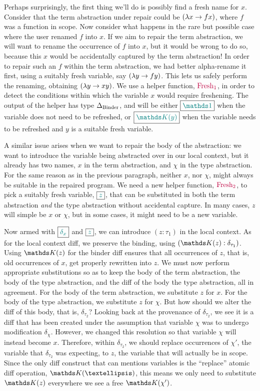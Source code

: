 Perhaps surprisingly, the first thing we'll do is possibly find a fresh name for
$x$.  Consider that the term abstraction under repair could be $({\lambda} {x} \rightarrow f
x)$, where $f$ was a function in scope.  Now consider what happens in the rare
but possible case where the user renamed $f$ into $x$.  If we aim to repair the
term abstraction, we will want to rename the occurrence of $f$ into $x$, but it
would be wrong to do so, because this $x$ would be accidentally captured by the
term abstraction!  In order to repair such an $f$ within the term abstraction,
we had better alpha-rename it first, using a suitably fresh variable, say
$({\lambda} {y} \rightarrow f y)$.  This lets us safely perform the renaming, obtaining
$({\lambda} {y} \rightarrow x y)$.  We use a helper function, $\textcolor{purple}{\text{Fresh}_1}$, in order to
detect the conditions within which the variable $x$ would require freshening.
The output of the helper has type $\Delta_{\normalfont \text{Binder}}$, and will be either
$\out{\MathSame{}}$ when the variable does not need to be refreshed, or
$\out{\MathReplace{y}}$ when the variable needs to be refreshed and $y$ is a
suitable fresh variable.

A similar issue arises when we want to repair the body of the abstraction: we
want to introduce the variable being abstracted over in our local context, but
it already has two names, $x$ in the term abstraction, and $\chi$ in the type
abstraction.  For the same reason as in the previous paragraph, neither $x$, nor
$\chi$, might always be suitable in the repaired program.  We need a new helper
function, $\textcolor{purple}{\text{Fresh}_2}$, to pick a suitably fresh variable, $\boxed{ \textcolor{teal}{z} }$, that can
be substituted in both the term abstraction \emph{and} the type abstraction
without accidental capture.  In many cases, $z$ will simple be $x$ or $\chi$,
but in some cases, it might need to be a new variable.

Now armed with $\boxed{ \textcolor{teal}{\delta_x} }$ and $\boxed{ \textcolor{teal}{z} }$, we can introduce $(z : \tau_1)$
in the local context.  As for the local context diff, we preserve the binding,
using $\MathLocalAssum{\MathReplace{z}}{\delta_{\tau_{1}}}$.  Using
$\MathReplace{z}$ for the binder diff ensures that all occurrences of $z$, that
is, old occurrences of $x$, get properly rewritten into $z$.  We must now
perform appropriate substitutions so as to keep the body of the term
abstraction, the body of the type abstraction, and the diff of the body the type
abstraction, all in agreement.  For the body of the term abstraction, we
substitute $z$ for $x$.  For the body of the type abstraction, we substitute $z$
for $\chi$.  But how should we alter the diff of this body, that is,
$\delta_{\tau_{2}}$?  Looking back at the provenance of $\delta_{\tau_{2}}$, we
see it is a diff that has been created under the assumption that variable $\chi$
was to undergo modification $\delta_{\chi}$.  However, we changed this
resolution so that variable $\chi$ will instead become $x$.  Therefore, within
$\delta_{\tau_{2}}$, we should replace occurrences of $\chi'$, the variable that
$\delta_{\tau_{2}}$ was expecting, to $z$, the variable that will actually be in
scope.  Since the only diff construct that can mentions variables is the
``replace'' atomic diff operation, $\MathReplace{…}$, this means we only need to
substitute $\MathReplace{z}$ everywhere we see a free $\MathReplace{\chi'}$.

